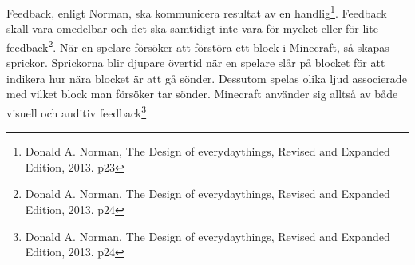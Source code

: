 Feedback, enligt Norman, ska kommunicera resultat av en handlig\footnote{Donald A. Norman, The Design of everydaythings, Revised and Expanded Edition, 2013. p23}.
Feedback skall vara omedelbar och det ska samtidigt inte vara för mycket eller för lite feedback\footnote{Donald A. Norman, The Design of everydaythings, Revised and Expanded Edition, 2013. p24}.
När en spelare försöker att förstöra ett block i Minecraft, så skapas sprickor. Sprickorna blir djupare övertid när en spelare slår på blocket för att 
indikera hur nära blocket är att gå sönder. Dessutom spelas olika ljud associerade med vilket block man försöker tar sönder. Minecraft använder sig alltså av både visuell och auditiv feedback\footnote{Donald A. Norman, The Design of everydaythings, Revised and Expanded Edition, 2013. p24}